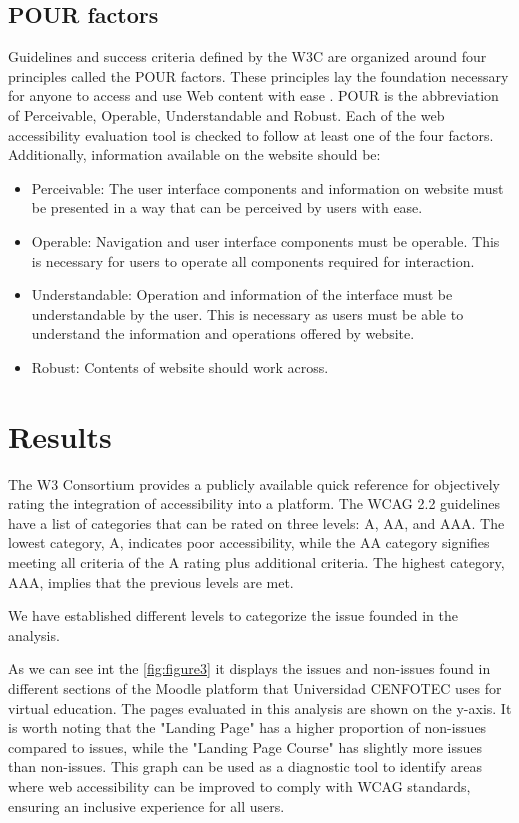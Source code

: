 \documentclass{IEEEtran}
\begin{document}
\subsection{POUR factors}
Guidelines and success criteria defined by the W3C are organized around four principles called the POUR factors. These principles lay the foundation necessary for anyone to access and use Web content with ease \cite{Moorman1999}. POUR is the abbreviation of Perceivable, Operable, Understandable and Robust. Each of the web accessibility evaluation tool is checked to follow at least one of the four factors. Additionally, information available on the website should be:


\begin{itemize}
    \item Perceivable: The user interface components and information on website must be presented in a way that can be perceived by users with ease.
    \item Operable: Navigation and user interface components must be operable. This is necessary for users to operate all components required for interaction.
    \item Understandable: Operation and information of the interface must be understandable by the user. This is necessary as users must be able to understand the information and operations offered by website.
    \item Robust: Contents of website should work across.
\end{itemize}



\section{Results}
The W3 Consortium provides a publicly available quick reference for objectively rating the integration of accessibility into a platform. The WCAG 2.2 guidelines have a list of categories that can be rated on three levels: A, AA, and AAA. The lowest category, A, indicates poor accessibility, while the AA category signifies meeting all criteria of the A rating plus additional criteria. The highest category, AAA, implies that the previous levels are met.

We have established different levels to categorize the issue founded in the analysis.

As we can see int the \ref{fig:figure3} it displays the issues and non-issues found in different sections of the Moodle platform that Universidad CENFOTEC uses for virtual education. The pages evaluated in this analysis are shown on the y-axis. It is worth noting that the "Landing Page" has a higher proportion of non-issues compared to issues, while the "Landing Page Course" has slightly more issues than non-issues. This graph can be used as a diagnostic tool to identify areas where web accessibility can be improved to comply with WCAG standards, ensuring an inclusive experience for all users.
\end{document}
